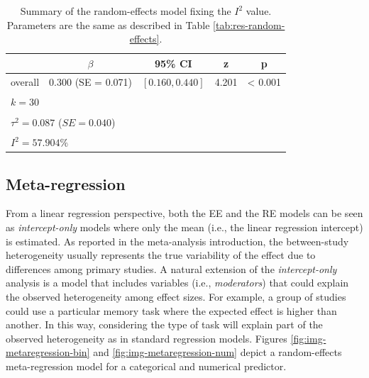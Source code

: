 \documentclass[
  man,floatsintext]{apa6}
\begin{document}
\normalsize

\scriptsize

\begin{table}[H]

\caption{\label{tab:res-random-effects-i2}Summary of the random-effects model fixing the \(I^2\) value. Parameters are the same as described in Table \ref{tab:res-random-effects}.}
\centering
\fontsize{9}{11}\selectfont
\begin{tabular}[t]{ccccc}
\toprule
 & $\beta$ & 95\% CI & z & p\\
\midrule
overall & 0.300 (SE = 0.071) & $[0.160, 0.440]$ & 4.201 & < 0.001\\
\bottomrule
\multicolumn{5}{l}{\textsuperscript{} $k = 30$}\\
\multicolumn{5}{l}{\textsuperscript{} $\tau^2 = 0.087$ ($SE = 0.040$)}\\
\multicolumn{5}{l}{\textsuperscript{} $I^2 = 57.904\%$}\\
\end{tabular}
\end{table}

\normalsize

\hypertarget{metareg}{%
\subsection{Meta-regression}\label{metareg}}

From a linear regression perspective, both the EE and the RE models can be seen as \emph{intercept-only} models where only the mean (i.e., the linear regression intercept) is estimated. As reported in the meta-analysis introduction, the between-study heterogeneity usually represents the true variability of the effect due to differences among primary studies. A natural extension of the \emph{intercept-only} analysis is a model that includes variables (i.e., \emph{moderators}) that could explain the observed heterogeneity among effect sizes. For example, a group of studies could use a particular memory task where the expected effect is higher than another. In this way, considering the type of task will explain part of the observed heterogeneity as in standard regression models. Figures \ref{fig:img-metaregression-bin} and \ref{fig:img-metaregression-num} depict a random-effects meta-regression model for a categorical and numerical predictor.

\scriptsize
\end{document}
